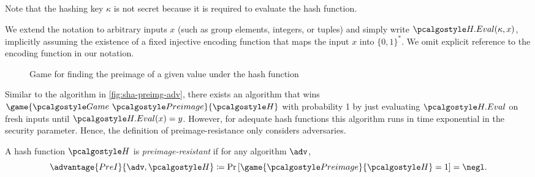Note that the hashing key $\kappa$ is not secret because it is required to evaluate the hash function.

\begin{remark}
  We extend the notation to arbitrary inputs $x$ (such as group elements, integers, or tuples) and simply write $\algo{H.Eval}(\kappa, x)$, implicitly assuming the existence of a fixed injective encoding function that maps the input $x$ into $\{0,1\}^*$.
  We omit explicit reference to the encoding function in our notation.
\end{remark}

\begin{figure}[tbhp]
  \begin{center}
    \begin{tcolorbox}[width=5cm]
      \begin{pchstack}[center]
      \end{pchstack}
    \end{tcolorbox}
  \end{center}
  \caption{Game for finding the preimage of a given value under the hash function \label{fig:break-hash}}
\end{figure}

Similar to the algorithm in \autoref{fig:sha-preimg-adv}, there exists an algorithm that wins $\game{\Game~\algo{Preimage}}{\algo{H}}$ with probability 1 by just evaluating $\algo{H.Eval}$ on fresh inputs until $\algo{H.Eval}(x) = y$.
However, for adequate hash functions this algorithm runs in time exponential in the security parameter.
Hence, the definition of preimage-resistance only considers \ppt adversaries.

\begin{definition}\label{def:preimage-resistance}
  A hash function $\algo{H}$ is \emph{preimage-resistant} if for any \ppt algorithm $\adv$,
 \[
  \advantage{PreI}{\adv, \algo{H}} \defeq \pr{\game{\algo{Preimage}}{\algo{H}} = 1} = \negl.
 \]
\end{definition}

